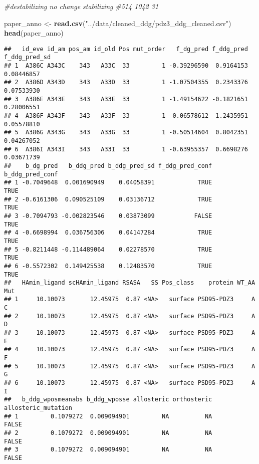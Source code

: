 \documentclass[
]{article}
\newenvironment{Shaded}{\begin{snugshade}}{\end{snugshade}}
\newcommand{\CommentTok}[1]{\textcolor[rgb]{0.56,0.35,0.01}{\textit{#1}}}
\newcommand{\FunctionTok}[1]{\textcolor[rgb]{0.13,0.29,0.53}{\textbf{#1}}}
\newcommand{\NormalTok}[1]{#1}
\newcommand{\OtherTok}[1]{\textcolor[rgb]{0.56,0.35,0.01}{#1}}
\newcommand{\StringTok}[1]{\textcolor[rgb]{0.31,0.60,0.02}{#1}}
\begin{document}
\begin{Shaded}
\begin{Highlighting}[]
\CommentTok{\#destabilizing     no change   stabilizing }
\CommentTok{\#514          1042            31 }

\NormalTok{paper\_anno }\OtherTok{\textless{}{-}} \FunctionTok{read.csv}\NormalTok{(}\StringTok{"../data/cleaned\_ddg/pdz3\_ddg\_cleaned.csv"}\NormalTok{)}
\FunctionTok{head}\NormalTok{(paper\_anno)}
\end{Highlighting}
\end{Shaded}

\begin{verbatim}
##   id_eve id_am pos_am id_old Pos mut_order   f_dg_pred f_ddg_pred f_ddg_pred_sd
## 1  A386C A343C    343   A33C  33         1 -0.39296590  0.9164153    0.08446857
## 2  A386D A343D    343   A33D  33         1 -1.07504355  0.2343376    0.07533930
## 3  A386E A343E    343   A33E  33         1 -1.49154622 -0.1821651    0.28006551
## 4  A386F A343F    343   A33F  33         1 -0.06578612  1.2435951    0.05578810
## 5  A386G A343G    343   A33G  33         1 -0.50514604  0.8042351    0.04267052
## 6  A386I A343I    343   A33I  33         1 -0.63955357  0.6698276    0.03671739
##    b_dg_pred   b_ddg_pred b_ddg_pred_sd f_ddg_pred_conf b_ddg_pred_conf
## 1 -0.7049648  0.001690949    0.04058391            TRUE            TRUE
## 2 -0.6161306  0.090525109    0.03136712            TRUE            TRUE
## 3 -0.7094793 -0.002823546    0.03873099           FALSE            TRUE
## 4 -0.6698994  0.036756306    0.04147284            TRUE            TRUE
## 5 -0.8211448 -0.114489064    0.02278570            TRUE            TRUE
## 6 -0.5572302  0.149425538    0.12483570            TRUE            TRUE
##   HAmin_ligand scHAmin_ligand RSASA   SS Pos_class    protein WT_AA Mut
## 1     10.10073       12.45975  0.87 <NA>   surface PSD95-PDZ3     A   C
## 2     10.10073       12.45975  0.87 <NA>   surface PSD95-PDZ3     A   D
## 3     10.10073       12.45975  0.87 <NA>   surface PSD95-PDZ3     A   E
## 4     10.10073       12.45975  0.87 <NA>   surface PSD95-PDZ3     A   F
## 5     10.10073       12.45975  0.87 <NA>   surface PSD95-PDZ3     A   G
## 6     10.10073       12.45975  0.87 <NA>   surface PSD95-PDZ3     A   I
##   b_ddg_wposmeanabs b_ddg_wposse allosteric orthosteric allosteric_mutation
## 1         0.1079272  0.009094901         NA          NA               FALSE
## 2         0.1079272  0.009094901         NA          NA               FALSE
## 3         0.1079272  0.009094901         NA          NA               FALSE

\end{verbatim}
\end{document}
